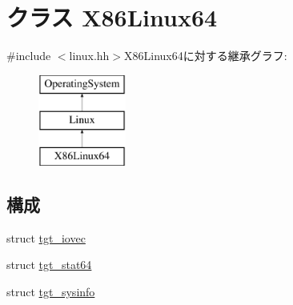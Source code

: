 \hypertarget{classX86Linux64}{
\section{クラス X86Linux64}
\label{classX86Linux64}
}


{\ttfamily \#include $<$linux.hh$>$}X86Linux64に対する継承グラフ:\begin{figure}[H]
\begin{center}
\leavevmode
\includegraphics[height=3cm]{classX86Linux64}
\end{center}
\end{figure}
\subsection*{構成}
\begin{DoxyCompactItemize}
\item 
struct \hyperlink{structX86Linux64_1_1tgt__iovec}{tgt\_\-iovec}
\item 
struct \hyperlink{structX86Linux64_1_1tgt__stat64}{tgt\_\-stat64}
\item 
struct \hyperlink{structX86Linux64_1_1tgt__sysinfo}{tgt\_\-sysinfo}
\end{DoxyCompactItemize}
